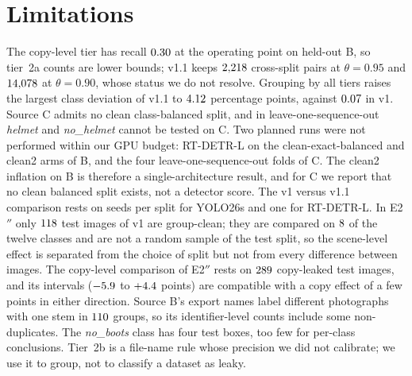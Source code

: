 \documentclass[review,12pt]{elsarticle}
\begin{document}
\section{Limitations}
\label{sec:limitations}
The copy-level tier has recall $0.30$ at the operating point on
held-out B, so tier~2a counts are lower bounds; v1.1 keeps
$2{,}218$ cross-split pairs at $\theta=0.95$ and $14{,}078$
at $\theta=0.90$, whose status we do not resolve. Grouping by all tiers
raises the largest class deviation of v1.1 to $4.12$ percentage
points, against $0.07$ in v1. Source C admits no clean
class-balanced split, and in leave-one-sequence-out \emph{helmet} and
\emph{no\_helmet} cannot be tested on C. Two planned runs were not
performed within our GPU budget: RT-DETR-L on the
clean-exact-balanced and clean2 arms of B, and the four
leave-one-sequence-out folds of C. The clean2 inflation on B is
therefore a single-architecture result, and for C we report that no
clean balanced split exists, not a detector score. The v1 versus v1.1
comparison rests on \ntFourYoloFixN{} seeds per split for YOLO26s and
one for RT-DETR-L. In E2$''$ only
$118$ test images of v1 are group-clean; they are compared
on $8$ of the twelve classes and are not a random sample of
the test split, so the scene-level effect is separated from the choice
of split but not from every difference between images. The
copy-level comparison of E2$''$ rests on $289$ copy-leaked test
images, and its intervals ($-5.9$ to
$+4.4$ points) are compatible with a copy effect of a
few points in either direction. Source B's export names
label different photographs with one stem in $110$
groups, so its identifier-level counts include some non-duplicates.
The \emph{no\_boots} class has four test boxes, too few for per-class
conclusions. Tier~2b is a file-name rule whose precision we did not
calibrate; we use it to group, not to classify a dataset as leaky.
\end{document}
